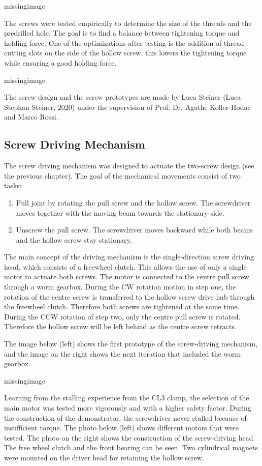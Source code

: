 missingimage

The screws were tested empirically to determine the size of the threads and the predrilled hole. The goal is to find a balance between tightening torque and holding force. One of the optimizations after testing is the addition of thread-cutting slots on the side of the hollow screw, this lowers the tightening torque while ensuring a good holding force.

missingimage

The screw design and the screw prototypes are made by Luca Steiner (Luca Stephan Steiner, 2020) under the supervision of Prof. Dr. Agathe Koller-Hodac and Marco Rossi.

\subsection{Screw Driving Mechanism}
The screw driving mechanism was designed to actuate the two-screw design (see the previous chapter). The goal of the mechanical movements consist of two tasks:

\begin{enumerate}
    \item Pull joint by rotating the pull screw and the hollow screw. The screwdriver moves together with the moving beam towards the stationary-side.
    \item Unscrew the pull screw. The screwdriver moves backward while both beams and the hollow screw stay stationary.
\end{enumerate}

The main concept of the driving mechanism is the single-direction screw driving head, which consists of a freewheel clutch. This allows the use of only a single motor to actuate both screws. The motor is connected to the centre pull screw through a worm gearbox. During the CW rotation motion in step one, the rotation of the centre screw is transferred to the hollow screw drive hub through the freewheel clutch. Therefore both screws are tightened at the same time. During the CCW rotation of step two, only the centre pull screw is rotated. Therefore the hollow screw will be left behind as the centre screw retracts.

The image below (left) shows the first prototype of the screw-driving mechanism, and the image on the right shows the next iteration that included the worm gearbox. 

missingimage

Learning from the stalling experience from the CL3 clamp, the selection of the main motor was tested more vigorously and with a higher safety factor. During the construction of the demonstrator, the screwdriver never stalled because of insufficient torque. The photo below (left) shows different motors that were tested. The photo on the right shows the construction of the screw-driving head. The free wheel clutch and the front bearing can be seen. Two cylindrical magnets were mounted on the driver head for retaining the hollow screw.

